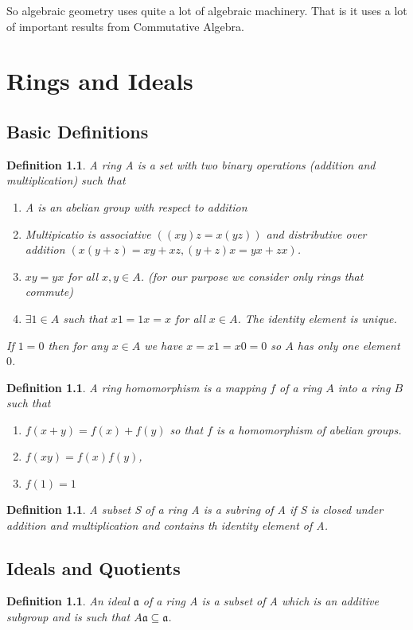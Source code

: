 \documentclass[]{report}
\newtheorem{defn}[theorem]{Definition}
\begin{document}
So algebraic geometry uses quite a lot of algebraic machinery. That is it uses a lot of important results from Commutative Algebra. 

\chapter{Rings and Ideals}
\section{Basic Definitions}
\begin{defn} 
    A ring A is a set with two binary operations (addition and multiplication) such that
\begin{enumerate}
    \item A is an abelian group with respect to addition
    \item Multipicatio is associative $((xy)z = x(yz))$ and distributive over addition $(x(y+z) = xy+xz, (y+z)x = yx + zx)$.  
    \item $xy=yx$ for all $x,y\in A$. (for our purpose we consider only rings that commute)
    \item $\exists 1\in A$ such that $x1 = 1x = x$ for all $x\in A$. 
The identity element is unique. 
\end{enumerate}

If $1=0$ then for any $x\in A$ we have $x=x1=x0 =0$ so $A$ has only one element $0$.
\end{defn}

\begin{defn} A ring homomorphism is a mapping $f$ of a ring $A$ into a ring $B$ such that
    \begin{enumerate}
        \item $f(x+y) = f(x) + f(y)$ so that $f$ is a homomorphism of abelian groups.
        \item $f(xy) = f(x)f(y)$,
        \item $f(1) = 1$
    \end{enumerate}
\end{defn}

\begin{defn} A subset S of a ring A is a subring of A if S is closed under addition and multiplication and contains th identity element of A. 
\end{defn}

\section{Ideals and Quotients}
\begin{defn}
    An ideal $\mathfrak{a}$ of a ring A is a subset of A which is an additive subgroup and is such that $A\mathfrak{a\subseteq a}$.
\end{defn}
\end{document}
